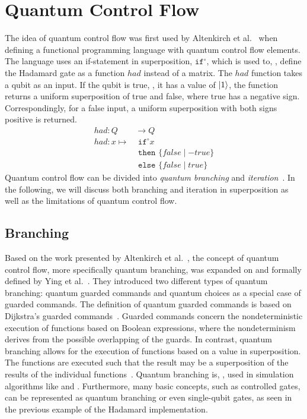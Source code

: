 \section{Quantum Control Flow}
\label{sec:background_quantumControlFlow}
The idea of quantum control flow was first used by Altenkirch et al.~\cite{AlGr05} when defining a functional programming language with quantum control flow elements. The language uses an if-statement in superposition, $\texttt{if}^\circ$, which is used to, \eg, define the Hadamard gate as a function $had$ instead of a matrix. The $had$ function takes a qubit as an input. If the qubit is true, \ie, it has a value of $\ket{1}$, the function returns a uniform superposition of true and false, where true has a negative sign. Correspondingly, for a false input, a uniform superposition with both signs positive is returned.
\begin{align*}
    had : Q& \to Q\\
    had : x \mapsto& \texttt{ if}^\circ x\\
                   & \texttt{ then } \{false \mid -true\}\\
                   & \texttt{ else } \{false \mid true\}
\end{align*}
Quantum control flow can be divided into \emph{quantum branching} and \emph{iteration}~\cite{YVC24}. In the following, we will discuss both branching and iteration in superposition as well as the limitations of quantum control flow. 

\subsection{Branching}
\label{sec:background_branching}
Based on the work presented by Altenkirch et al.~\cite{AlGr05}, the concept of quantum control flow, more specifically quantum branching, was expanded on and formally defined by Ying et al.~\cite{YYF12}. They introduced two different types of quantum branching: quantum guarded commands and quantum choices as a special case of guarded commands. The definition of quantum guarded commands is based on Dijkstra's guarded commands~\cite{Dijk75}. Guarded commands concern the nondeterministic execution of functions based on Boolean expressions, where the nondeterminism derives from the possible overlapping of the guards. In contrast, quantum branching allows for the execution of functions based on a value in superposition. The functions are executed such that the result may be a superposition of the results of the individual functions~\cite{YVC24}.
Quantum branching is, \eg, used in simulation algorithms like \cite{BGB*18} and \cite{LoCh19}. Furthermore, many basic concepts, such as controlled gates, can be represented as quantum branching or even single-qubit gates, as seen in the previous example of the Hadamard implementation.

